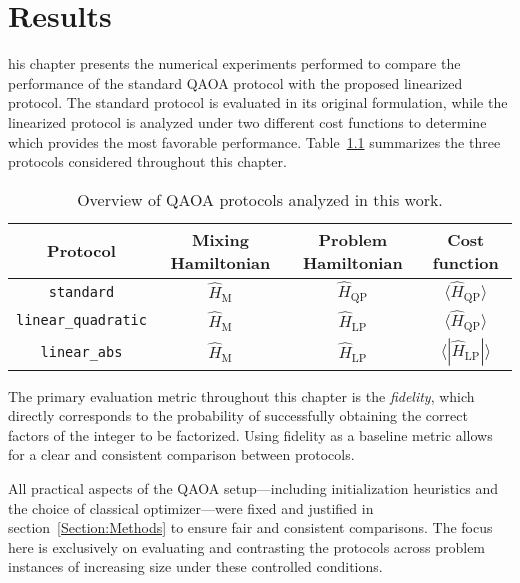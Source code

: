 \chapter{Results}
\label{Chapter:Results}

his chapter presents the numerical experiments performed to compare the performance
of the standard QAOA protocol with the proposed linearized protocol. The standard protocol is
evaluated in its original formulation, while the linearized protocol is analyzed under two different
cost functions to determine which provides the most favorable performance. Table~\ref{tab:protocols_overview}
summarizes the three protocols considered throughout this chapter. 

\begin{table}[h]
    \centering
    \begin{tabular}{@{}cccc@{}}
        \toprule
        Protocol            & Mixing Hamiltonian    & Problem Hamiltonian   & Cost function \\
        \midrule
        \texttt{standard}            & $\hat{H}_\mathrm{M}$   & $\hat{H}_\mathrm{QP}$ & $\langle \hat{H}_\mathrm{QP} \rangle$ \\
        \texttt{linear\_quadratic}   & $\hat{H}_\mathrm{M}$   & $\hat{H}_\mathrm{LP}$ & $\langle \hat{H}_\mathrm{QP} \rangle$ \\
        \texttt{linear\_abs}         & $\hat{H}_\mathrm{M}$   & $\hat{H}_\mathrm{LP}$ & $\langle |\hat{H}_\mathrm{LP}| \rangle$ \\
        \bottomrule
    \end{tabular}
    \caption{Overview of QAOA protocols analyzed in this work.}
    \label{tab:protocols_overview}
\end{table}

The primary evaluation metric throughout this chapter is the \emph{fidelity}, which directly
corresponds to the probability of successfully obtaining the correct factors of the integer
to be factorized. Using fidelity as a baseline metric allows for a clear and consistent
comparison between protocols.

All practical aspects of the QAOA setup---including initialization heuristics and the choice of
classical optimizer---were fixed and justified in section~\ref{Section:Methods} to ensure
fair and consistent comparisons. The focus here is exclusively on evaluating and contrasting
the protocols across problem instances of increasing size under these controlled conditions.

